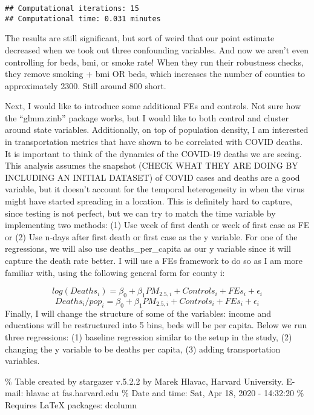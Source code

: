 \documentclass[]{article}
\begin{document}
\begin{verbatim}
## Computational iterations: 15 
## Computational time: 0.031 minutes
\end{verbatim}

The results are still significant, but sort of weird that our point
estimate decreased when we took out three confounding variables. And now
we aren't even controlling for beds, bmi, or smoke rate! When they run
their robustness checks, they remove smoking + bmi OR beds, which
increases the number of counties to approximately 2300. Still around 800
short.

Next, I would like to introduce some additional FEs and controls. Not
sure how the ``glmm.zinb'' package works, but I would like to both
control and cluster around state variables. Additionally, on top of
population density, I am interested in transportation metrics that have
shown to be correlated with COVID deaths. It is important to think of
the dynamics of the COVID-19 deaths we are seeing. This analysis assumes
the snapshot (CHECK WHAT THEY ARE DOING BY INCLUDING AN INITIAL DATASET)
of COVID cases and deaths are a good variable, but it doesn't account
for the temporal heterogeneity in when the virus might have started
spreading in a location. This is definitely hard to capture, since
testing is not perfect, but we can try to match the time variable by
implementing two methods: (1) Use week of first death or week of first
case as FE or (2) Use n-days after first death or first case as the y
variable. For one of the regressions, we will also use
deaths\_per\_capita as our y variable since it will capture the death
rate better. I will use a FEs framework to do so as I am more familiar
with, using the following general form for county i:

\[ log(Deaths_i) = \beta_0 + \beta_1 PM_{2.5, i} + Controls_i + FEs_i + \epsilon_i\]
\[ Deaths_i/pop_i = \beta_0 + \beta_1 PM_{2.5, i} + Controls_i + FEs_i + \epsilon_i\]
Finally, I will change the structure of some of the variables: income
and educations will be restructured into 5 bins, beds will be per
capita. Below we run three regressions: (1) baseline regression similar
to the setup in the study, (2) changing the y variable to be deaths per
capita, (3) adding transportation variables.

\% Table created by stargazer v.5.2.2 by Marek Hlavac, Harvard
University. E-mail: hlavac at fas.harvard.edu \% Date and time: Sat, Apr
18, 2020 - 14:32:20 \% Requires LaTeX packages: dcolumn
\end{document}
